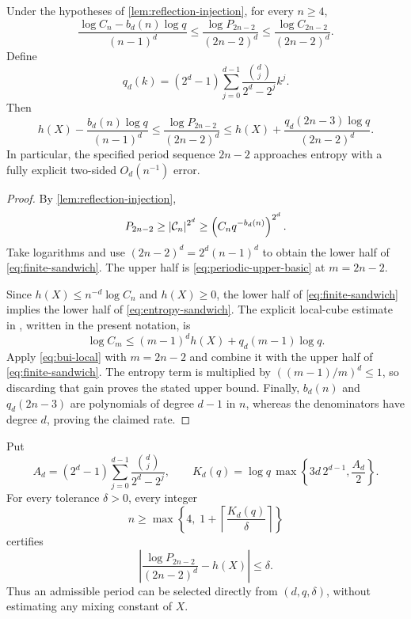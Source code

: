 \begin{theorem}
\label{thm:fixed-period}
Under the hypotheses of \cref{lem:reflection-injection}, for every $n\ge4$,
\begin{equation}
\frac{\log C_n-b_d(n)\log q}{(n-1)^d}
\le \frac{\log P_{2n-2}}{(2n-2)^d}
\le \frac{\log C_{2n-2}}{(2n-2)^d}.
\label{eq:finite-sandwich}
\end{equation}
Define
\begin{equation}
 q_d(k)=(2^d-1)\sum_{j=0}^{d-1}
 \frac{\binom dj}{2^d-2^j}k^j.
 \label{eq:bui-polynomial}
\end{equation}
Then
\begin{equation}
h(X)-\frac{b_d(n)\log q}{(n-1)^d}
\le \frac{\log P_{2n-2}}{(2n-2)^d}
\le h(X)+\frac{q_d(2n-3)\log q}{(2n-2)^d}.
\label{eq:entropy-sandwich}
\end{equation}
In particular, the specified period sequence $2n-2$ approaches entropy with
a fully explicit two-sided $O_d(n^{-1})$ error.
\end{theorem}

\begin{proof}
By \cref{lem:reflection-injection},
\[
 P_{2n-2}\ge |\mathcal C_n|^{2^d}
 \ge \left(C_nq^{-b_d(n)}\right)^{2^d}.
\]
Take logarithms and use $(2n-2)^d=2^d(n-1)^d$ to obtain the lower half of
\cref{eq:finite-sandwich}.  The upper half is
\cref{eq:periodic-upper-basic} at $m=2n-2$.

Since $h(X)\le n^{-d}\log C_n$ and $h(X)\ge0$, the lower half of
\cref{eq:finite-sandwich} implies the lower half of
\cref{eq:entropy-sandwich}.  The explicit local-cube estimate in
\cite{Bui2026}, written in the present notation, is
\begin{equation}
 \log C_m\le (m-1)^dh(X)+q_d(m-1)\log q.
 \label{eq:bui-local}
\end{equation}
Apply \cref{eq:bui-local} with $m=2n-2$ and combine it with the upper half of
\cref{eq:finite-sandwich}.  The entropy term is multiplied by
$((m-1)/m)^d\le1$, so discarding that gain proves the stated upper bound.
Finally, $b_d(n)$ and $q_d(2n-3)$ are polynomials of degree $d-1$ in $n$,
whereas the denominators have degree $d$, proving the claimed rate.
\end{proof}

\begin{corollary}
\label{cor:target-accuracy}
Put
\[
 A_d=(2^d-1)\sum_{j=0}^{d-1}
 \frac{\binom dj}{2^d-2^j},
 \qquad
 K_d(q)=\log q\,
 \max\left\{3d\,2^{d-1},\frac{A_d}{2}\right\}.
\]
For every tolerance $\delta>0$, every integer
\begin{equation}
 n\ge \max\left\{4,\;1+\left\lceil\frac{K_d(q)}{\delta}\right\rceil\right\}
 \label{eq:target-n}
\end{equation}
certifies
\[
 \left|
 \frac{\log P_{2n-2}}{(2n-2)^d}-h(X)
 \right|\le\delta.
\]
Thus an admissible period can be selected directly from $(d,q,\delta)$,
without estimating any mixing constant of $X$.
\end{corollary}

